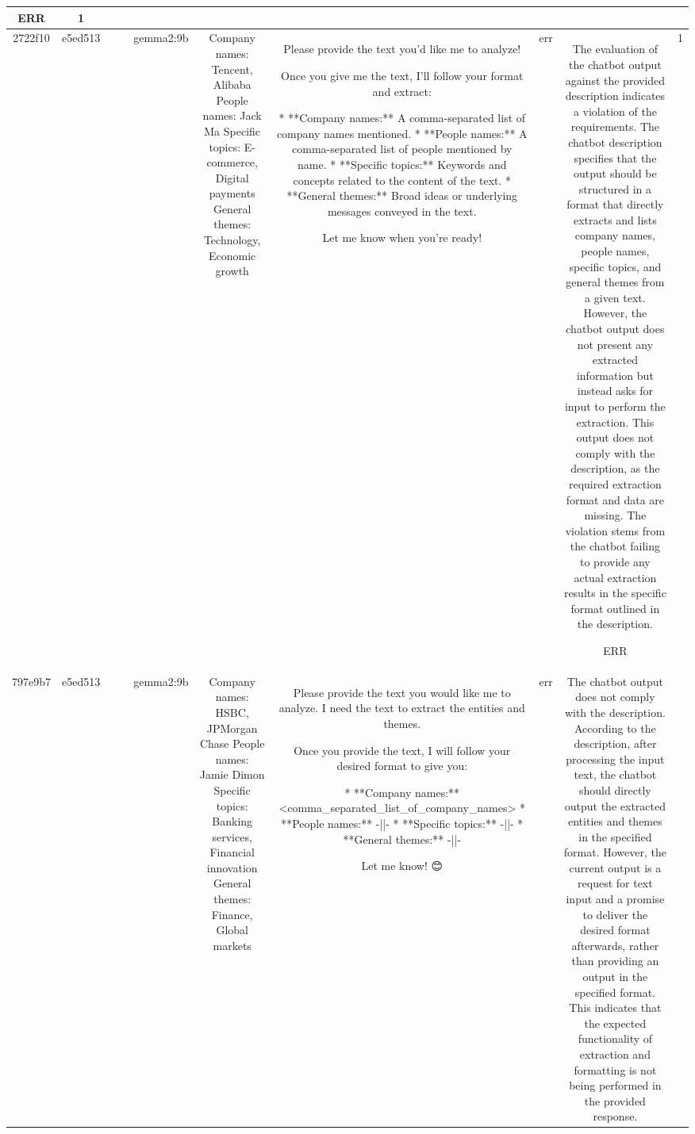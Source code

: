 \begin{table}[h!]
\begin{tabular}{|c|c|c|c|c|c|c|c|c|c|}
ERR & 1\\
\hline
2722f10 & e5ed513 &  &  & gemma2:9b & Company names: Tencent, Alibaba
People names: Jack Ma
Specific topics: E-commerce, Digital payments
General themes: Technology, Economic growth & Please provide the text you'd like me to analyze!  

Once you give me the text, I'll follow your format and extract:

* **Company names:** A comma-separated list of company names mentioned.
* **People names:** A comma-separated list of people mentioned by name.
* **Specific topics:** Keywords and concepts related to the content of the text.
* **General themes:**  Broad ideas or underlying messages conveyed in the text. 


Let me know when you're ready! 
 & err & The evaluation of the chatbot output against the provided description indicates a violation of the requirements. The chatbot description specifies that the output should be structured in a format that directly extracts and lists company names, people names, specific topics, and general themes from a given text. However, the chatbot output does not present any extracted information but instead asks for input to perform the extraction. This output does not comply with the description, as the required extraction format and data are missing. The violation stems from the chatbot failing to provide any actual extraction results in the specific format outlined in the description.

ERR & 1\\
\hline
797e9b7 & e5ed513 &  &  & gemma2:9b & Company names: HSBC, JPMorgan Chase
People names: Jamie Dimon
Specific topics: Banking services, Financial innovation
General themes: Finance, Global markets & Please provide the text you would like me to analyze. I need the text to extract the entities and themes.  

Once you provide the text, I will follow your desired format to give you:

* **Company names:** <comma_separated_list_of_company_names> 
* **People names:** -||-
* **Specific topics:** -||-
* **General themes:** -||-   


Let me know! 😊 
 & err & The chatbot output does not comply with the description. According to the description, after processing the input text, the chatbot should directly output the extracted entities and themes in the specified format. However, the current output is a request for text input and a promise to deliver the desired format afterwards, rather than providing an output in the specified format. This indicates that the expected functionality of extraction and formatting is not being performed in the provided response.


\end{tabular}
\end{table}
